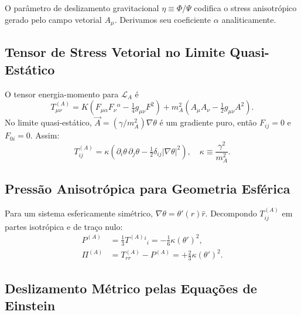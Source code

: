 \documentclass[aps,prd,twocolumn,showpacs,superscriptaddress]{revtex4-2}
\newcommand{\Lbar}{\mathcal{L}}
\begin{document}
O parâmetro de deslizamento gravitacional $\eta \equiv \Phi/\Psi$
codifica o stress anisotrópico gerado pelo campo vetorial $A_\mu$.
Derivamos seu coeficiente $\alpha$ analiticamente.

\subsection{Tensor de Stress Vetorial no Limite Quasi-Estático}

O tensor energia-momento para $\Lbar_A$ é
\begin{equation}
  T^{(A)}_{\mu\nu} = K\!\left(F_{\mu\alpha}F_\nu{}^\alpha
    - \tfrac{1}{4}g_{\mu\nu}F^2\right)
    + m_A^2\!\left(A_\mu A_\nu - \tfrac{1}{2}g_{\mu\nu}A^2\right).
\end{equation}
No limite quasi-estático, $\vec{A} = (\gamma/m_A^2)\nabla\theta$
é um gradiente puro, então $F_{ij} = 0$ e $F_{0i} = 0$.
Assim:
\begin{equation}
  T^{(A)}_{ij} = \kappa\!\left(
    \partial_i\theta\,\partial_j\theta
    - \tfrac{1}{2}\delta_{ij}|\nabla\theta|^2
  \right),
  \quad \kappa \equiv \frac{\gamma^2}{m_A^2}.
  \label{eq:TAij}
\end{equation}

\subsection{Pressão Anisotrópica para Geometria Esférica}

Para um sistema esfericamente simétrico,
$\nabla\theta = \theta'(r)\hat r$.
Decompondo $T^{(A)}_{ij}$ em partes isotrópica e de traço nulo:
\begin{align}
  P^{(A)} &= \tfrac{1}{3}T^{(A)}{}^i{}_i = -\tfrac{1}{6}\kappa(\theta')^2, \\
  \Pi^{(A)} &= T^{(A)}_{rr} - P^{(A)}
             = +\tfrac{2}{3}\kappa(\theta')^2.
  \label{eq:Pi}
\end{align}

\subsection{Deslizamento Métrico pelas Equações de Einstein}
\end{document}
